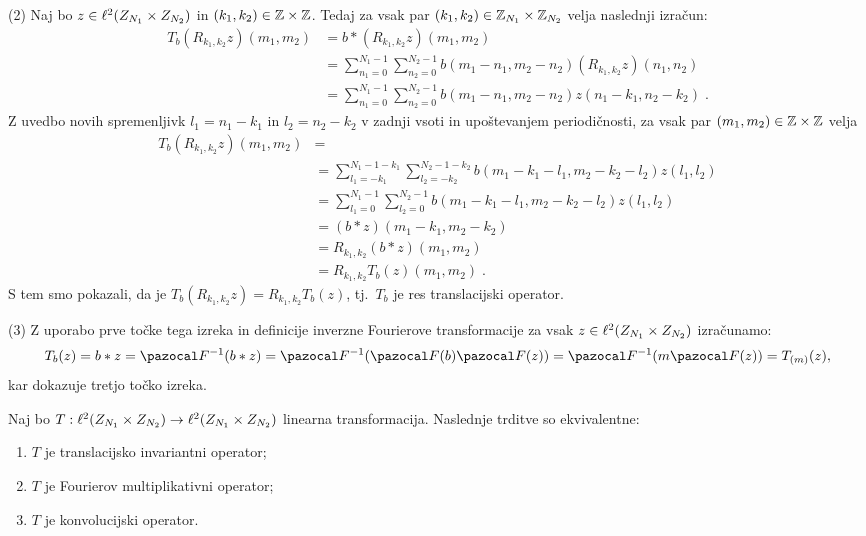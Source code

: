 \begin{dokaz}
(2) Naj bo $z \in \ell^2(Z_{N_1} \times Z_{N_2})$ in $(k_1, k_2) \in \mathbb Z \times \mathbb Z$. Tedaj za vsak par $(k_1, k_2) \in \mathbb Z_{N_1} \times \mathbb Z_{N_2}$ velja naslednji izračun:
%
\begin{align*}
T_b(R_{k_1, k_2}z)(m_1, m_2) & = b \ast (R_{k_1, k_2}z)(m_1, m_2) \\
& =  \sum_{n_1 = 0}^{N_1 - 1} \sum_{n_2 = 0}^{N_2 - 1} b(m_1 - n_1, m_2 - n_2) (R_{k_1, k_2}z)(n_1, n_2) \\
& =  \sum_{n_1 = 0}^{N_1 - 1} \sum_{n_2 = 0}^{N_2 - 1} b(m_1 - n_1, m_2 - n_2) z(n_1 - k_1, n_2 - k_2) \;.
\end{align*}
%
Z uvedbo novih spremenljivk $l_1 = n_1 - k_1$ in $l_2 = n_2 - k_2$ v zadnji vsoti in upoštevanjem periodičnosti, za vsak par $(m_1, m_2) \in \mathbb Z \times \mathbb Z$ velja
%
\begin{align*}
T_b(R_{k_1, k_2}z)(m_1, m_2) & = \\
& = \sum_{l_1 = -k_1}^{N_1 - 1 - k_1} \sum_{l_2 = -k_2}^{N_2 - 1 - k_2} b(m_1 - k_1 - l_1, m_2 - k_2 - l_2) z(l_1, l_2) \\
& = \sum_{l_1 = 0}^{N_1 - 1} \sum_{l_2 = 0}^{N_2 - 1} b(m_1 - k_1 - l_1, m_2 - k_2 - l_2) z(l_1, l_2) \\
& = (b \ast z)(m_1 - k_1, m_2 - k_2) \\
& = R_{k_1, k_2}(b \ast z)(m_1, m_2) \\
& = R_{k_1, k_2}T_b(z)(m_1, m_2) \;.
\end{align*}
%
S tem smo pokazali, da je $T_b(R_{k_1, k_2}z) = R_{k_1, k_2}T_b(z)$, tj.\ $T_b$ je res translacijski operator.

(3) Z uporabo prve točke tega izreka in definicije inverzne Fourierove transformacije za vsak $z \in \ell^2(Z_{N_1} \times Z_{N_2})$ izračunamo:
%
\begin{equation*}
T_b(z) = b \ast z = \F^{-1}(b \ast z) = \F^{-1}(\F(b) \F(z)) = \F^{-1}(m \F(z)) = T_{(m)}(z),
\end{equation*}
%
kar dokazuje tretjo točko izreka.
\end{dokaz}
%
\begin{izrek}
Naj bo $T : \ell^2(Z_{N_1} \times Z_{N_2}) \to \ell^2(Z_{N_1} \times Z_{N_2})$ linearna transformacija. Naslednje trditve so ekvivalentne:
%
\begin{enumerate}
  \item $T$ je translacijsko invariantni operator;
  \item $T$ je Fourierov multiplikativni operator;
  \item $T$ je konvolucijski operator.
\end{enumerate}
%
\end{izrek}
%
